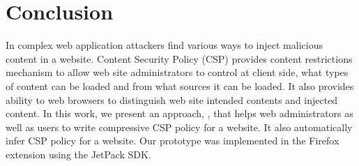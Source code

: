 \section{Conclusion}
\label{sec:conclu}

In complex web application attackers find various ways to inject
malicious content in a website. Content Security Policy (CSP) provides
content restrictions mechanism to allow web site administrators to
control at client side, what types of content can be loaded and from
what sources it can be loaded. It also provides ability to web
browsers to distinguish web site intended contents and injected
content. In this work, we present an approach, \codename, that helps
web administrators as well as users to write compressive CSP policy
for a website. It also automatically infer CSP policy for a
website. Our prototype was implemented in the Firefox extension using
the JetPack SDK.
